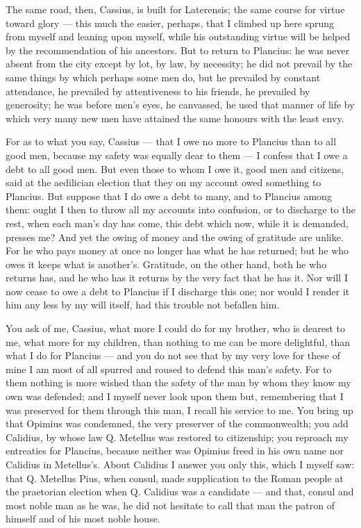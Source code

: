  The same road, then, Cassius, is built for Laterensis; the same course for virtue toward glory --- this much the easier, perhaps, that I climbed up here sprung from myself and leaning upon myself, while his outstanding virtue will be helped by the recommendation of his ancestors. But to return to Plancius: he was never absent from the city except by lot, by law, by necessity; he did not prevail by the same things by which perhaps some men do, but he prevailed by constant attendance, he prevailed by attentiveness to his friends, he prevailed by generosity; he was before men's eyes, he canvassed, he used that manner of life by which very many new men have attained the same honours with the least envy.

 For as to what you say, Cassius --- that I owe no more to Plancius than to all good men, because my safety was equally dear to them --- I confess that I owe a debt to all good men. But even those to whom I owe it, good men and citizens, said at the aedilician election that they on my account owed something to Plancius. But suppose that I do owe a debt to many, and to Plancius among them: ought I then to throw all my accounts into confusion, or to discharge to the rest, when each man's day has come, this debt which now, while it is demanded, presses me? And yet the owing of money and the owing of gratitude are unlike. For he who pays money at once no longer has what he has returned; but he who owes it keeps what is another's. Gratitude, on the other hand, both he who returns has, and he who has it returns by the very fact that he has it. Nor will I now cease to owe a debt to Plancius if I discharge this one; nor would I render it him any less by my will itself, had this trouble not befallen him.

 You ask of me, Cassius, what more I could do for my brother, who is dearest to me, what more for my children, than nothing to me can be more delightful, than what I do for Plancius --- and you do not see that by my very love for these of mine I am most of all spurred and roused to defend this man's safety. For to them nothing is more wished than the safety of the man by whom they know my own was defended; and I myself never look upon them but, remembering that I was preserved for them through this man, I recall his service to me. You bring up that Opimius was condemned, the very preserver of the commonwealth; you add Calidius, by whose law Q. Metellus was restored to citizenship; you reproach my entreaties for Plancius, because neither was Opimius freed in his own name nor Calidius in Metellus's. About Calidius I answer you only this, which I myself saw: that Q. Metellus Pius, when consul, made supplication to the Roman people at the praetorian election when Q. Calidius was a candidate --- and that, consul and most noble man as he was, he did not hesitate to call that man the patron of himself and of his most noble house.

